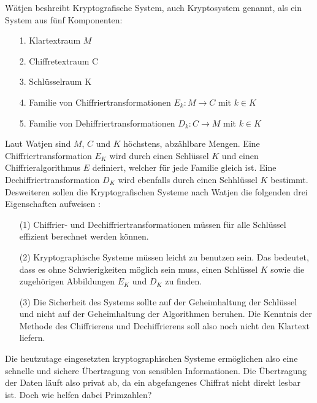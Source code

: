 Wätjen beshreibt Kryptografische System, auch Kryptosystem genannt, als ein System aus fünf Komponenten:

\begin{itemize}
\item[ 1. ]  Klartextraum $M$
\item[ 2. ]  Chiffretextraum C
\item[ 3. ]  Schlüsselraum K
\item[ 4. ]  Familie von Chiffriertransformationen $E_k:M \rightarrow C$ mit $k \in K$
\item[ 5. ]  Familie von Dehiffriertransformationen $D_k:C \rightarrow M$ mit $k \in K$
\end{itemize}

Laut Watjen sind $M$, $C$ und $K$ höchstens, abzählbare Mengen. Eine Chiffriertransformation $E_K$ wird durch einen Schlüssel $K$ und einen Chiffrieralgorithmus $E$ definiert, welcher für jede Familie gleich ist. Eine Dechiffriertransformation $D_K$ wird ebenfalls durch einen Schhlüssel $K$ bestimmt. Desweiteren sollen die Kryptografischen Systeme nach Watjen die folgenden drei Eigenschaften aufweisen \cite[S. 3]{Watjen.2018}:

\begin{itemize}
\item[ (1) ]  Chiffrier- und Dechiffriertransformationen müssen für alle Schlüssel effizient berechnet werden können.
\item[ (2) ]  Kryptographische Systeme müssen leicht zu benutzen sein. Das bedeutet, dass es ohne Schwierigkeiten möglich sein muss, einen Schlüssel $K$ sowie die zugehörigen Abbildungen
$E_K$ und $D_K$ zu finden.
\item[ (3) ]  Die Sicherheit des Systems sollte auf der Geheimhaltung der Schlüssel und nicht
auf der Geheimhaltung der Algorithmen beruhen. Die Kenntnis der Methode des
Chiffrierens und Dechiffrierens soll also noch nicht den Klartext liefern.
\end{itemize}

Die heutzutage eingesetzten kryptographischen Systeme ermöglichen also eine schnelle und sichere Übertragung von sensiblen Informationen. Die Übertragung der Daten läuft also privat ab, da ein abgefangenes Chiffrat nicht direkt lesbar ist. Doch wie helfen dabei Primzahlen?\\

